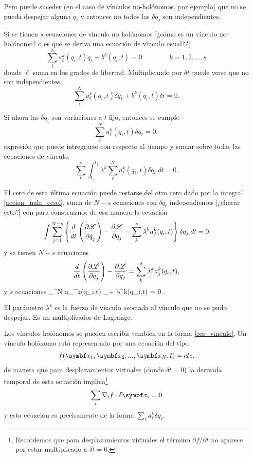\documentclass[10pt,oneside]{CBFT_book}
\begin{document}
Pero puede suceder (en el caso de vínculos no-holónomos, por ejemplo) que no se pueda despejar alguna $ q_j $ y 
entonces no todos los  $\delta q_j$ son independientes.

Si se tienen $s$ ecuaciones de vínculo no holónomos [¿cómo es un vínculo no-holónomo? o es que se deriva una
ecuación de vínculo usual??]
\[
	\sum_{\ell}^N a_\ell^k(q_i,t) \dot{q}_\ell + b^k(q_i,t) = 0 \qquad \qquad k=1,2,...,s
\]
donde $\ell$ suma en los grados de libertad.
Multiplicando por $\delta t$ puede verse que no son independientes,
\[
	\sum_{\ell}^N a_\ell^k(q_i,t) \delta {q}_\ell + b^k(q_i,t) \delta t= 0 .
\]

Si ahora las $\delta q_\ell$ son variaciones a $t$ fijo, entonces se cumple 
\[
	\sum_{\ell}^N a_\ell^k(q_i,t) \delta {q}_\ell = 0,
\]
expresión que puede intregrarse con respecto al tiempo y sumar sobre todas las ecuaciones de vínculo,
\[
	\sum_{k}^s \int_{t_i}^{t_f} \lambda^k \sum_{\ell}^N a_\ell^k(q_i,t) \delta {q}_\ell \: dt = 0.
\]

El cero de esta última ecuación puede restarse del otro cero dado por la integral \eqref{accion_nula_ecsel},
suma de $N-s$ ecuaciones con $\delta q_\ell$ independientes [¿checar esto?] con para construirnos de esa manera la ecuación
\[
	\int \sum_{j=1}^{N-s} \left\{ \frac{d}{dt}\left( \frac{\partial^{\hspace{-0.05em}} {\mathscr{L}}}{\partial {\dot{q}_j}^{\hspace{-0.05em}}} \right) -\frac{\partial^{\hspace{-0.05em}} {\mathscr{L}}}{\partial {q_j}^{\hspace{-0.05em}}}
	- \sum_{k}^s \lambda^k a_j^k(q_i,t) \right\} \delta {q}_j \: dt = 0
\]
y se tienen $N-s$ ecuaciones
\[
	\frac{d}{dt}\left( \frac{\partial^{\hspace{-0.05em}} {\mathscr{L}}}{\partial {\dot{q}_j}^{\hspace{-0.05em}}} \right) -\frac{\partial^{\hspace{-0.05em}} {\mathscr{L}}}{\partial {q_j}^{\hspace{-0.05em}}} =  \sum_{k}^s \lambda^k a_j^k(q_i,t),
\]
y $s$ ecuaciones 
\be
	\sum_{\ell}^N a_\ell^k(q_i,t) _\ell + b^k(q_i,t) = 0 .
	\label{ecs_vinculo}
\ee

El parámetro $ \lambda^k $ es la fuerza de vínculo asociada al vínculo que no se pudo despejar. Es un multiplicador de
Lagrange.

Los vínculos holónomos se pueden escribir también en la forma \eqref{ecs_vinculo}. Un vínculo holónomo está representado
por una ecuación del tipo 
\[
	f( \vb{x}_1, \vb{x}_2, ...,\vb{x}_N, t ) = cte.
\]
de manera que para desplazamientos virtuales (donde $\delta t=0$) la derivada temporal de esta ecuación implica\footnote{Recordemos
que para desplazamientos virtuales el término $\partial f /\partial t$ no aparece por estar multiplicado a $\delta t=0$.} 
\[
	\sum_i \nabla_i f \cdot \delta\vb{x}_i = 0
\]
y esta ecuación es precisamente de la forma $ \sum_\ell a_\ell^k \delta q_\ell $.
\end{document}
